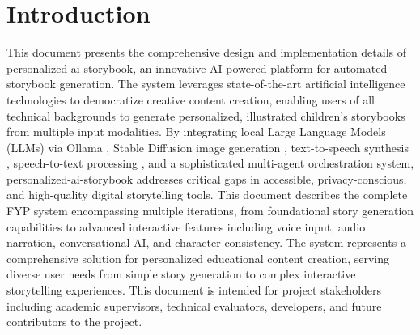 \chapter{Introduction}
\label{sec:introduction}
This document presents the comprehensive design and implementation details of personalized-ai-storybook, an innovative AI-powered platform for automated storybook generation. The system leverages state-of-the-art artificial intelligence technologies to democratize creative content creation, enabling users of all technical backgrounds to generate personalized, illustrated children's storybooks from multiple input modalities. By integrating local Large Language Models (LLMs) via Ollama \cite{ollama2024}, Stable Diffusion image generation \cite{rombach2022highresolution, stablediffusion2022}, text-to-speech synthesis \cite{coqui2024}, speech-to-text processing \cite{whisper2023}, and a sophisticated multi-agent orchestration system, personalized-ai-storybook addresses critical gaps in accessible, privacy-conscious, and high-quality digital storytelling tools. This document describes the complete FYP system encompassing multiple iterations, from foundational story generation capabilities to advanced interactive features including voice input, audio narration, conversational AI, and character consistency. The system represents a comprehensive solution for personalized educational content creation, serving diverse user needs from simple story generation to complex interactive storytelling experiences. This document is intended for project stakeholders including academic supervisors, technical evaluators, developers, and future contributors to the project.

